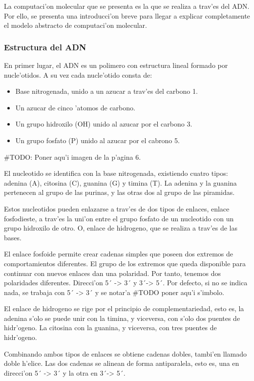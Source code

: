 \documentclass[12pt]{article}
\begin{document}
La computaci'on molecular que se presenta es la que se realiza a trav'es del ADN. Por ello, se presenta una
introducci'on breve para llegar a explicar completamente el modelo abstracto de computaci'on molecular.

\subsubsection{Estructura del ADN}

En primer lugar, el ADN es un polimero con estructura lineal formado por nucle'otidos. A su vez cada
nucle'otido consta de:

\begin{itemize}
	\item Base nitrogenada, unido a un azucar a trav'es del carbono 1.
	\item Un azucar de cinco 'atomos de carbono.
	\item Un grupo hidroxilo (OH) unido al azucar por el carbono 3.
	\item Un grupo fosfato (P) unido al azucar por el cabrono 5.
\end{itemize}

#TODO: Poner aqu'i imagen de la p'agina 6.

El nucleotido se identifica con la base nitrogenada, existiendo cuatro tipos: adenina (A), citosina (C),
guanina (G) y timina (T). La adenina y la guanina pertenecen al grupo de las purinas, y las otras dos
al grupo de las piramidas.

Estos nucleotidos pueden enlazarse a trav'es de dos tipos de enlaces, enlace fosfodieste, a trav'es
la uni'on entre el grupo fosfato de un nucleotido con un grupo hidroxilo de otro. O, enlace de hidrogeno,
que se realiza a trav'es de las bases.

El enlace fosfoide permite crear cadenas simples que poseen dos extremos de comportamientos diferentes. El grupo
de los extremos que queda disponible para continuar con nuevos enlaces dan una polaridad. Por tanto, tenemos dos
polaridades diferentes. Direcci'on 5´ -> 3´ y 3´-> 5´. Por defecto, si no se indica nada, se trabaja con 5´ -> 3´
y se notar'a #TODO poner aqu'i s'imbolo.

El enlace de hidrogeno se rige por el principio de complementariedad, esto es, la adenina s'olo se
puede unir con la timina, y viceversa, con s'olo dos puentes de hidr'ogeno. La citosina con la guanina,
 y viceversa, con tres puentes de hidr'ogeno.

 Combinando ambos tipos de enlaces se obtiene cadenas dobles, tambi'en llamado doble h'elice. Las dos cadenas
 se alinean de forma antiparalela, esto es, una en direcci'on 5´ -> 3´ y la otra en 3´-> 5´.
\end{document}
